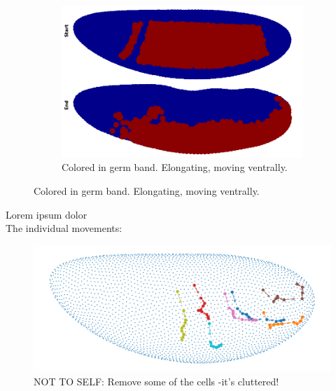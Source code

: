 \begin{figure}[H]
\begin{subfigure}[b]{0.25\textwidth}
    \end{subfigure}
     \hfill
    \begin{subfigure}[b]{0.7\textwidth}
    \includegraphics[width=\textwidth]{chapters/Results/figures/gb_firstframe_lastframe.png}
    \caption{Colored in germ band. Elongating, moving ventrally.}
    \end{subfigure}
    
\end{figure}


Lorem ipsum dolor 
\\

The individual movements:

\begin{figure}[H]
    \centering
    \includegraphics[width=1\linewidth]{chapters/Results/figures/movements.png}
    \caption{NOT TO SELF: Remove some of the cells -it's cluttered!}
    \label{fig:enter-label}
\end{figure}


